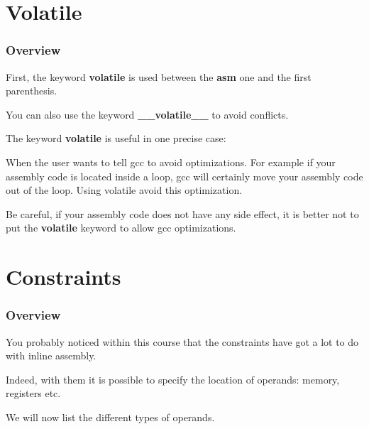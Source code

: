 %
%

\section{Volatile}


\begin{frame}
  \frametitle{Overview}

  First, the keyword \textbf{volatile} is used between the \textbf{asm}
  one and the first parenthesis.

  \-

  You can also use the keyword \textbf{\_\_volatile\_\_} to avoid conflicts.

  \-

  The keyword \textbf{volatile} is useful in one precise case:

  \-

  When the user wants to tell gcc to avoid optimizations.
  For example if your assembly code is located inside a loop, gcc
  will certainly move your assembly code out of the loop.
  Using volatile avoid this optimization.

  \-

  Be careful, if your assembly code does not have any side effect,
  it is better not to put the \textbf{volatile} keyword to allow gcc
  optimizations.
\end{frame}

%
%

\section{Constraints}


\begin{frame}
  \frametitle{Overview}

  You probably noticed within this course that the constraints have got
  a lot to do with inline assembly.

  \-

  Indeed, with them it is possible to specify the location of
  operands: memory, registers etc.

  \-

  We will now list the different types of operands.
\end{frame}


